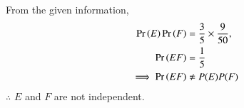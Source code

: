 From the given information,
\begin{align}
	\Pr\left(E\right) \Pr\left(F\right)&=\frac{3}{5} \times \frac{9}{50},
\\
	\Pr\left(E F\right)&=\frac{1}{5}
\\
	\implies \Pr\left(E F\right) &\neq P(E) P(F)
\end{align}
$\therefore$ $E$ and $F$ are not independent.
